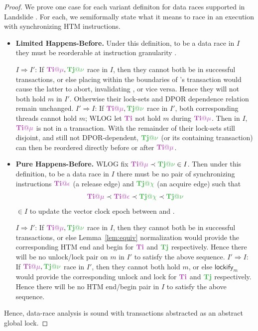 \documentclass[10pt]{sigplanconf}
\begin{document}
\begin{proof}
We prove one case for each variant definiton for data races supported in Landslide \cite{quicksand}.
For each, we semiformally state what it means to race in an execution with synchronizing HTM instructions.

\begin{itemize}
	\item {\bf Limited Happens-Before.}
		Under this definition, to be a data race in $I$ they must be reorderable at instruction granularity
		\cite{tsan,hybriddatarace}.
		\begin{itemize}
			\llitem $I \Rightarrow I'$:
				If $\tiiat{\mu},\tjjat{\nu}$ race in $I$,
				then they cannot both be in successful transactions,
				or else placing \tiiat{\mu} within the boundaries of \tjjat{\nu}'s transaction
				would cause the latter to abort, invalidating \tjjat{\nu}, or vice versa.
				Hence they will not both hold $m$ in $I'$.
				Otherwise their lock-sets and DPOR dependence relation remain unchanged.
			\llitem $I' \Rightarrow I$:
				If $\tiiat{\mu},\tjjat{\nu}$ race in $I'$,
				both corresponding threads cannot hold $m$;
				WLOG let $\tii$ not hold $m$ during $\tiiat{\mu}$.
				Then in $I$, $\tiiat{\mu}$ is not in a transaction.
				With the remainder of their lock-sets still disjoint,
				and still not DPOR-dependent, $\tjjat{\nu}$ (or its containing transaction)
				can then be reordered directly before or after $\tiiat{\mu}$.
		\end{itemize}
	\item {\bf Pure Happens-Before.}
		WLOG fix $\tiiat{\mu} \prec \tjjat{\nu} \in I$.
		Then under this definition, to be a data race in $I$ there must be no pair of synchronizing instructions
		$\tiiat{\epsilon}$ (a release edge) and $\tjjat{\chi}$ (an acquire edge) such that
		\[
			\tiiat{\mu} \prec \tiiat{\epsilon} \prec \tjjat{\chi} \prec \tjjat{\nu}
		\]
		$\in I$ to update the vector clock epoch between \tiiat{\mu} and \tjjat{\nu} \cite{djit,fasttrack}.
		\begin{itemize}
			\llitem $I \Rightarrow I'$:
				If $\tiiat{\mu},\tjjat{\nu}$ race in $I$,
				then they cannot both be in successful transactions,
				or else Lemma~\ref{lem:equiv} normalization would provide
				the corresponding HTM end and begin for $\tii$ and $\tjj$ respectively.
				Hence there will be no unlock/lock pair on $m$ in $I'$ to satisfy the above sequence.
			\llitem $I' \Rightarrow I$:
				If $\tiiat{\mu},\tjjat{\nu}$ race in $I'$,
				then they cannot both hold $m$,
				or else $\mathsf{lockify}_m$ would provide the corresponding
				unlock and lock for $\tii$ and $\tjj$ respectively.
				Hence there will be no HTM end/begin pair in $I$ to satisfy the above sequence.
		\end{itemize}
\end{itemize}
Hence, data-race analysis is sound with transactions abstracted as an abstract global lock.
\end{proof}
\end{document}
